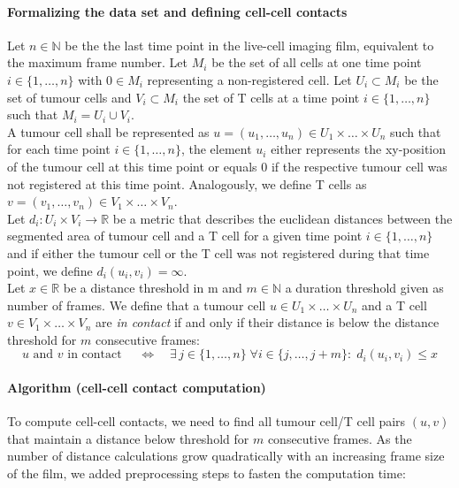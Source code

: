\documentclass{report}
\begin{document}
\paragraph{Formalizing the data set and defining cell-cell contacts} 
Let $n \in \mathbb{N}$ be the the last time point in the live-cell imaging film, equivalent to the maximum frame number. 
Let $M_i$ be the set of all cells at one time point $i \in \{1, \dots, n\}$ with $0 \in M_i$ representing a non-registered cell. Let $U_i \subset M_i$ be the set of tumour cells and $V_i \subset M_i$ the set of T cells at a time point $i \in \{1, \dots, n\}$ such that $M_i = U_i \cup V_i$. \\

A tumour cell shall be represented as $u = (u_1, \dots, u_n) \in U_1 \times \dots \times U_n$ such that for each time point $i \in \{1, \dots, n\}$, the element $u_i$  either represents the xy-position of the tumour cell at this time point or equals $0$ if the respective tumour cell was not registered at this time point. Analogously, we define T cells as $v = (v_1, \dots, v_n) \in V_1 \times \dots \times V_n$.\\

Let $d_i: U_i \times V_i \to \mathbb{R}$ be a metric that describes the euclidean distances between the segmented area of tumour cell and a T cell for a given time point $i \in \{1, \dots,n\}$ and if either the tumour cell or the T cell was not registered during that time point, we define $d_i(u_i, v_i) = \infty$.\\

Let $x \in \mathbb{R}$ be a distance threshold in \textmu m and $m \in \mathbb{N}$ a duration threshold given as number of frames. We define that a tumour cell $u \in U_1 \times \dots \times U_n$ and a T cell $v \in V_1 \times \dots \times V_n$ are \textit{in contact} if and only if their distance is below the distance threshold for $m$ consecutive frames:
\begin{equation*}
	u \text{ and } v \text{ in contact } 
		\quad \Leftrightarrow \quad 
		\exists \, j \in \{1, \dots, n\} \;
		\forall i \in \{j, \dots, j+m\}: \;
	 	d_i(u_i, v_i) \le x
\end{equation*}

\paragraph{Algorithm (cell-cell contact computation)} To compute cell-cell contacts, we need to find all tumour cell/T cell pairs $(u,v)$ that maintain a distance below threshold for $m$ consecutive frames. As the number of distance calculations grow quadratically with an increasing frame size of the film, we added preprocessing steps to fasten the computation time:\\
\end{document}
